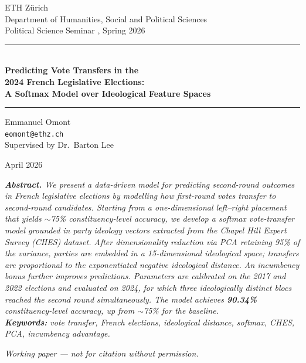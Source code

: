 \documentclass[10pt, a4paper]{article}
\begin{document}
\begin{titlepage}
  \thispagestyle{empty}
  \centering
  \vspace*{2cm}

  {\large ETH Zürich \\ Department of Humanities, Social and Political Sciences \\[0.4em]
   Political Science Seminar , Spring 2026}

  \vspace{2.5cm}

  \rule{\linewidth}{1pt}\\[0.6em]
  {\LARGE \bfseries Predicting Vote Transfers in the\\[0.3em]
   2024 French Legislative Elections:\\[0.4em]
   A Softmax Model over Ideological Feature Spaces}\\[0.4em]
  \rule{\linewidth}{1pt}

  \vspace{2cm}

  {\large Emmanuel Omont}\\[0.3em]
  {\normalsize \texttt{eomont@ethz.ch}}\\[1em]
  {\normalsize Supervised by Dr.\ Barton Lee}

  \vspace{2cm}

  {\normalsize April 2026}

  \vspace{3cm}

  \begin{minipage}{0.82\linewidth}
    \small\itshape
    \textbf{Abstract.}
    We present a data-driven model for predicting second-round outcomes in French legislative
    elections by modelling how first-round votes transfer to second-round candidates.
    Starting from a one-dimensional left--right placement that yields $\sim$75\%
    constituency-level accuracy, we develop a softmax vote-transfer model grounded in party
    ideology vectors extracted from the Chapel Hill Expert Survey (CHES) dataset.
    After dimensionality reduction via PCA retaining 95\% of the variance, parties are
    embedded in a 15-dimensional ideological space; transfers are proportional to the
    exponentiated negative ideological distance.  An incumbency bonus further improves
    predictions.  Parameters are calibrated on the 2017 and 2022 elections and evaluated on
    2024, for which three ideologically distinct blocs reached the second round simultaneously.
    The model achieves \textbf{90.34\%} constituency-level accuracy, up from $\sim$75\% for
    the baseline.  \\[0.5em]
    \textbf{Keywords:} vote transfer, French elections, ideological distance, softmax,
    CHES, PCA, incumbency advantage.
  \end{minipage}

  \vfill
  \small
  \textit{Working paper — not for citation without permission.}
\end{titlepage}
\end{document}
